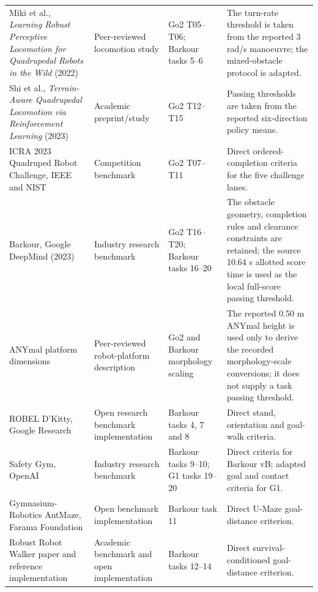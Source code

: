 \begin{landscape}
\begin{longtable}{@{}>{\raggedright\arraybackslash}p{50mm}>{\raggedright\arraybackslash}p{34mm}>{\raggedright\arraybackslash}p{39mm}>{\raggedright\arraybackslash}p{85mm}@{}}
Miki et al., \emph{Learning Robust Perceptive Locomotion for Quadrupedal
Robots in the Wild} (2022) \citep{miki2022perceptive} &
Peer-reviewed locomotion study &
Go2 T05--T06; Barkour tasks 5--6 &
The turn-rate threshold is taken from the reported 3 rad/s manoeuvre; the
mixed-obstacle protocol is adapted. \\

Shi et al., \emph{Terrain-Aware Quadrupedal Locomotion via Reinforcement
Learning} (2023) \citep{shi2023terrain} &
Academic preprint/study &
Go2 T12--T15 &
Passing thresholds are taken from the reported six-direction policy means. \\

ICRA 2023 Quadruped Robot Challenge, IEEE and NIST
\citep{jacoff2023quadruped} &
Competition benchmark &
Go2 T07--T11 &
Direct ordered-completion criteria for the five challenge lanes. \\

Barkour, Google DeepMind (2023)
\citep{caluwaerts2023barkour,yu2024barkourdesign} &
Industry research benchmark &
Go2 T16--T20; Barkour tasks 16--20 &
The obstacle geometry, completion rules and clearance constraints are
retained; the source 10.64 s allotted score time is used as the local
full-score passing threshold. \\

ANYmal platform dimensions \citep{hutter2016anymal} &
Peer-reviewed robot-platform description &
Go2 and Barkour morphology scaling &
The reported 0.50 m ANYmal height is used only to derive the recorded
morphology-scale conversions; it does not supply a task passing threshold. \\

ROBEL D'Kitty, Google Research
\citep{ahn2020robel,robel2020software} &
Open research benchmark implementation &
Barkour tasks 4, 7 and 8 &
Direct stand, orientation and goal-walk criteria. \\

Safety Gym, OpenAI
\citep{ray2019safetygym,openai2019safetygym} &
Industry research benchmark &
Barkour tasks 9--10; G1 tasks 19--20 &
Direct criteria for Barkour vB; adapted goal and contact criteria for G1. \\

Gymnasium-Robotics AntMaze, Farama Foundation
\citep{delazcano2026gymnasiumrobotics} &
Open benchmark implementation &
Barkour task 11 &
Direct U-Maze goal-distance criterion. \\

Robust Robot Walker paper and reference implementation
\citep{zhu2025robustwalker,zhu2025robustwalkercode} &
Academic benchmark and open implementation &
Barkour tasks 12--14 &
Direct survival-conditioned goal-distance criterion. \\


\end{longtable}
\end{landscape}
